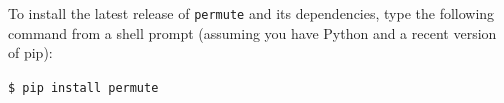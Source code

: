\documentclass[]{article}
\begin{document}
To install the latest release of \texttt{permute} and its dependencies, type
the following command from a shell prompt (assuming you have Python and a
recent version of pip):

\texttt{\$ pip install permute}


%
%    
%




\end{document}
